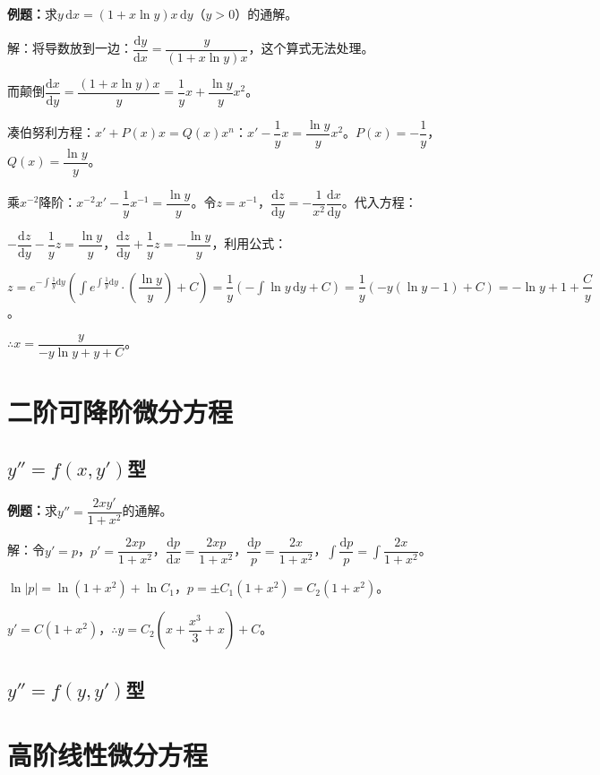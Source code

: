\documentclass[UTF8, 12pt]{ctexart}
\begin{document}
\textbf{例题：}求$y\,\textrm{d}x=(1+x\ln y)x\,\textrm{d}y$（$y>0$）的通解。

解：将导数放到一边：$\dfrac{\textrm{d}y}{\textrm{d}x}=\dfrac{y}{(1+x\ln y)x}$，这个算式无法处理。

而颠倒$\dfrac{\textrm{d}x}{\textrm{d}y}=\dfrac{(1+x\ln y)x}{y}=\dfrac{1}{y}x+\dfrac{\ln y}{y}x^2$。

凑伯努利方程：$x'+P(x)x=Q(x)x^n$：$x'-\dfrac{1}{y}x=\dfrac{\ln y}{y}x^2$。$P(x)=-\dfrac{1}{y}$，$Q(x)=\dfrac{\ln y}{y}$。

乘$x^{-2}$降阶：$x^{-2}x'-\dfrac{1}{y}x^{-1}=\dfrac{\ln y}{y}$。令$z=x^{-1}$，$\dfrac{\textrm{d}z}{\textrm{d}y}=-\dfrac{1}{x^2}\dfrac{\textrm{d}x}{\textrm{d}y}$。代入方程：

$-\dfrac{\textrm{d}z}{\textrm{d}y}-\dfrac{1}{y}z=\dfrac{\ln y}{y}$，$\dfrac{\textrm{d}z}{\textrm{d}y}+\dfrac{1}{y}z=-\dfrac{\ln y}{y}$，利用公式：

$z=e^{-\int\frac{1}{y}\textrm{d}y}\left(\displaystyle{\int e^{\int\frac{1}{y}\textrm{d}y}\cdot\left(\dfrac{\ln y}{y}\right)+C}\right)=\dfrac{1}{y}(-\int\ln y\,\textrm{d}y+C)=\dfrac{1}{y}(-y(\ln y-1)+C)=-\ln y+1+\dfrac{C}{y}$。

$\therefore x=\dfrac{y}{-y\ln y+y+C}$。

\section{二阶可降阶微分方程}

\subsection{\texorpdfstring{$y''=f(x,y')$}\ 型}

\textbf{例题：}求$y''=\dfrac{2xy'}{1+x^2}$的通解。

解：令$y'=p$，$p'=\dfrac{2xp}{1+x^2}$，$\dfrac{\textrm{d}p}{\textrm{d}x}=\dfrac{2xp}{1+x^2}$，$\dfrac{\textrm{d}p}{p}=\dfrac{2x}{1+x^2}$，$\displaystyle{\int\dfrac{\textrm{d}p}{p}=\int\dfrac{2x}{1+x^2}}$。

$\ln\vert p\vert=\ln(1+x^2)+\ln C_1$，$p=\pm C_1(1+x^2)=C_2(1+x^2)$。

$y'=C(1+x^2)$，$\therefore y=C_2\left(x+\dfrac{x^3}{3}+x\right)+C$。

\subsection{\texorpdfstring{$y''=f(y,y')$}\ 型}

\section{高阶线性微分方程}
\end{document}
